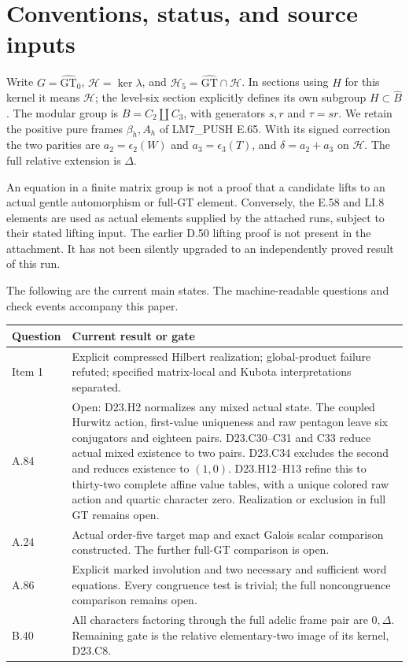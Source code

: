 \documentclass[11pt]{article}
\newcommand{\GT}{\widehat{\mathrm{GT}}}
\newcommand{\GTz}{\widehat{\mathrm{GT}}_0}
\begin{document}
\section{Conventions, status, and source inputs}
Write $G=\GTz$, $\mathcal H=\ker\lambda$, and
$\mathcal H_5=\GT\cap\mathcal H$.  In sections using $H$
for this kernel it means $\mathcal H$; the level-six section
explicitly defines its own subgroup $H\subset\widehat B$.
The modular group is $B=C_2\amalg C_3$, with generators
$s,r$ and $\tau=sr$.  We retain the positive pure frames
$\beta_h,A_h$ of LM7\_PUSH E.65.  With its signed correction
the two parities are $a_2=\epsilon_2(W)$ and
$a_3=\epsilon_3(T)$, and $\delta=a_2+a_3$ on $\mathcal H$.
The full relative extension is $\Delta$.

An equation in a finite matrix group is not a proof that a
candidate lifts to an actual gentle automorphism or full-GT
element.  Conversely, the E.58 and LI.8 elements are used as
actual elements supplied by the attached runs, subject to their
stated lifting input.  The earlier D.50 lifting proof is not
present in the attachment.  It has not been silently upgraded
to an independently proved result of this run.

The following are the current main states.  The machine-readable
questions and check events accompany this paper.
\begin{center}\small
\begin{tabular}{p{.12\linewidth}p{.78\linewidth}}
\toprule
Question&Current result or gate\\\midrule
Item 1&Explicit compressed Hilbert realization; global-product
failure refuted; specified matrix-local and Kubota interpretations
separated.\\
A.84&Open: D23.H2 normalizes any mixed actual state. The
coupled Hurwitz action, first-value uniqueness and raw pentagon
leave six conjugators and eighteen pairs. D23.C30--C31 and C33
reduce actual mixed existence to two pairs. D23.C34 excludes
the second and reduces existence to $(1,0)$. D23.H12--H13 refine this to thirty-two complete affine value
tables, with a unique colored raw action and quartic character zero.
Realization or exclusion in full GT remains open.\\
A.24&Actual order-five target map and exact Galois scalar
comparison constructed. The further full-GT comparison is open.\\
A.86&Explicit marked involution and two necessary and sufficient
word equations. Every congruence test is trivial; the full
noncongruence comparison remains open.\\
B.40&All characters factoring through the full adelic frame pair
are $0,\Delta$. Remaining gate is the relative elementary-two
image of its kernel, D23.C8.\\\bottomrule
\end{tabular}\end{center}
\end{document}
